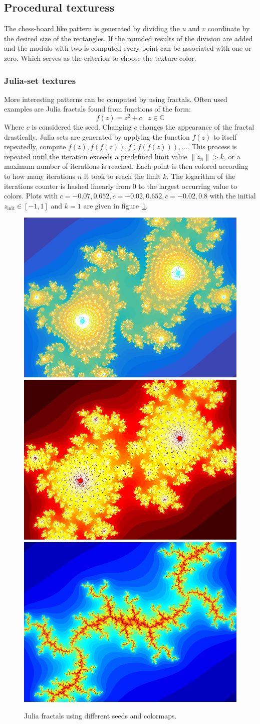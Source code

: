 \subsection{Procedural texturess}
The chess-board like pattern is generated by dividing the $u$ and $v$ coordinate by the desired size of the rectangles. If the rounded results of the division are added and the modulo with two is computed every point can be associated with one or zero. Which serves as the criterion to choose the texture color. 
\subsubsection{Julia-set textures}
More interesting patterns can be computed by using fractals. Often used examples are Julia fractals found from functions of the form:
\begin{equation}
f(z) = z^2 + c \;\;\; z \in \mathbb{C}
\end{equation}
Where $c$ is considered the seed. Changing $c$ changes the appearance of the fractal drastically. Julia sets are generated by applying the function $f(z)$ to itself repeatedly, compute $f(z),f(f(z)),f(f(f(z))),\dots$. This process is repeated until the iteration exceeds a predefined limit value $\|z_n \| > k$, or a maximum number of iterations is reached. Each point is then colored according to how many iterations $n$ it took to reach the limit $k$. The logarithm of the iterations counter is hashed linearly from 0 to the largest occurring value to colors. Plots with $c = -0.07,0.652, c = -0.02,0.652, c= -0.02,0.8$ with the initial $z_{\text{init}} \in [-1,1]$ and $k = 1$ are given in figure~\ref{fig:julia4}.
\begin{figure}
\centering
\includegraphics[width=0.25\linewidth]{./img/julia1New}
\includegraphics[width=0.25\linewidth]{./img/julia2}
\includegraphics[width=0.25\linewidth]{./img/julia4}
\caption{Julia fractals using different seeds and colormaps.}
\label{fig:julia4}
\end{figure}


